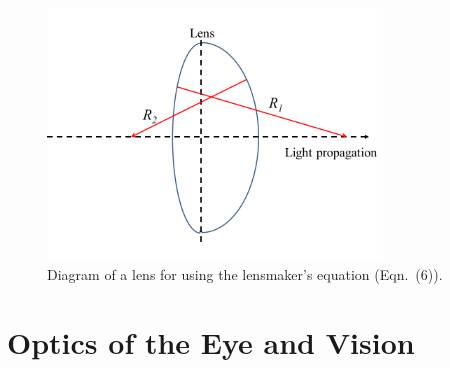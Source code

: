 \begin{figure}[h]
	\centering
	\includegraphics[width=3.5in]{./figures/Topic5/Fig5-7.png}
	\caption{Diagram of a lens for using the lensmaker's equation (Eqn.~(6)).}
	\label{Fig5-7}
\end{figure} 

\section{Optics of the Eye and Vision}

